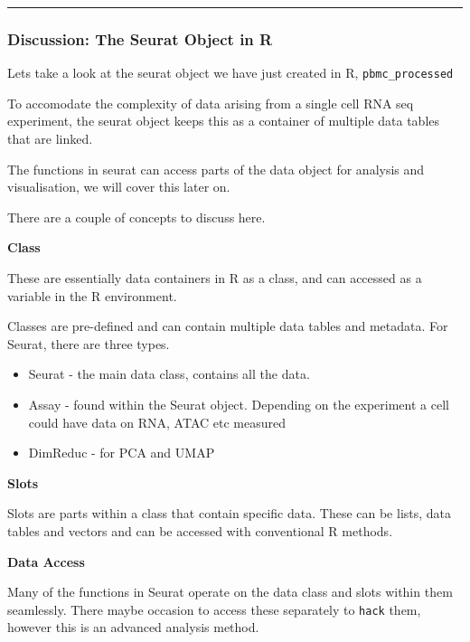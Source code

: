 \documentclass[
]{book}
\providecommand{\tightlist}{%
  \setlength{\itemsep}{0pt}\setlength{\parskip}{0pt}}
\begin{document}
\begin{center}\rule{0.5\linewidth}{0.5pt}\end{center}

\hypertarget{discussion-the-seurat-object-in-r}{%
\subsubsection*{Discussion: The Seurat Object in R}\label{discussion-the-seurat-object-in-r}}

Lets take a look at the seurat object we have just created in R, \texttt{pbmc\_processed}

To accomodate the complexity of data arising from a single cell RNA seq experiment, the seurat object keeps this as a container of multiple data tables that are linked.

The functions in seurat can access parts of the data object for analysis and visualisation, we will cover this later on.

There are a couple of concepts to discuss here.

\textbf{Class}

These are essentially data containers in R as a class, and can accessed as a variable in the R environment.

Classes are pre-defined and can contain multiple data tables and metadata. For Seurat, there are three types.

\begin{itemize}
\tightlist
\item
  Seurat - the main data class, contains all the data.
\item
  Assay - found within the Seurat object. Depending on the experiment a cell could have data on RNA, ATAC etc measured
\item
  DimReduc - for PCA and UMAP
\end{itemize}

\textbf{Slots}

Slots are parts within a class that contain specific data. These can be lists, data tables and vectors and can be accessed with conventional R methods.

\textbf{Data Access}

Many of the functions in Seurat operate on the data class and slots within them seamlessly. There maybe occasion to access these separately to \texttt{hack} them, however this is an advanced analysis method.
\end{document}
